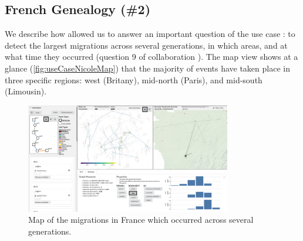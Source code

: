 


\subsection{French Genealogy (\#2)}

We describe how \name allowed us to answer an important question of the use case \nicole: to detect the largest migrations across several generations, in which areas, and at what time they occurred (question 9 of collaboration \nicole).
The map view shows at a glance (\autoref{fig:useCaseNicoleMap}) that the majority of events have taken place in three specific regions: west (Britany), mid-north (Paris), and mid-south (Limousin).

\begin{figure}[!ht]
    \centering
    \includegraphics[trim={82cmcm 30cm 0 0},clip,width=0.8\textwidth]{static/figures/ComBiNet/OriginalPaperFigures/suppMaterial/FrenchGenealogy}
    \caption{Map of the migrations in France which occurred across several generations.}\label{fig:useCaseNicoleMap}
\end{figure}

